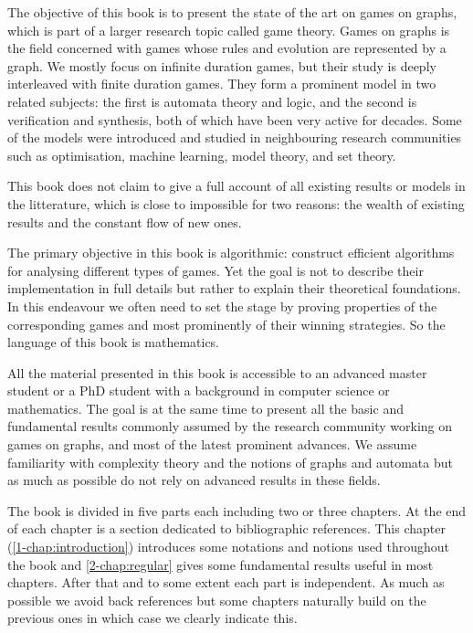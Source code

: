 The objective of this book is to present the state of the art on games on graphs, which is part of a larger research topic called game theory.
Games on graphs is the field concerned with games whose rules and evolution are represented by a graph. We mostly focus on infinite duration games, but their study is deeply interleaved with finite duration games.
They form a prominent model in two related subjects: the first is automata theory and logic, and the second is verification and synthesis,
both of which have been very active for decades.
Some of the models were introduced and studied in neighbouring research communities such as optimisation, machine learning, model theory, and set theory.

This book does not claim to give a full account of all existing results or models in the litterature, which is close to impossible for two reasons: the wealth of existing results and the constant flow of new ones.

The primary objective in this book is algorithmic: construct efficient algorithms for analysing different types of games.
Yet the goal is not to describe their implementation in full details but rather to explain their theoretical foundations.
In this endeavour we often need to set the stage by proving properties of the corresponding games and most prominently of their winning strategies. 
So the language of this book is mathematics.

All the material presented in this book is accessible to an advanced master student or a PhD student with a background in computer science or mathematics. The goal is at the same time to present all the basic and fundamental results commonly assumed by the research community working on games on graphs, and most of the latest prominent advances.
We assume familiarity with complexity theory and the notions of graphs and automata but as much as possible do not rely on advanced results in these fields.

The book is divided in five parts each including two or three chapters. At the end of each chapter is a section dedicated to bibliographic references. This chapter (\cref{1-chap:introduction}) introduces some notations and notions used throughout the book and \cref{2-chap:regular} gives some fundamental results useful in most chapters. After that and to some extent each part is independent. As much as possible we avoid back references but some chapters naturally build on the previous ones in which case we clearly indicate this.

